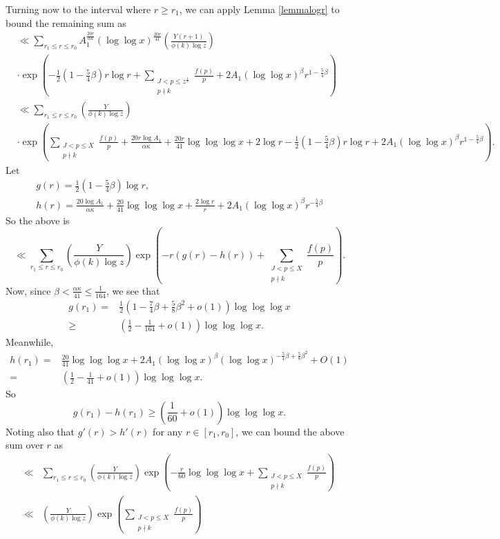 \documentclass{amsart}
\begin{document}
Turning now to the interval where $r\geq r_1$, we can apply Lemma \ref{lemmalogr} to bound the remaining sum as
\begin{align*}
&\ll \sum_{r_1\leq r\leq r_0}A_1^{\frac{20r}{\alpha\kappa}}\left(\log\log x\right)^{\frac{20r}{41}}\left(\frac{Y(r+1)}{\phi(k)\log z}\right)\\
&\cdot \exp\left(-\frac 12\left(1-\frac 54\beta\right)r\log r+\sum_{\substack{J<p\leq z^\frac 1r \\ p\nmid k}}\frac{f(p)}{p}+2A_1 (\log\log x)^{\beta}r^{1-\frac 54\beta}\right)\\
&\ll  \sum_{r_1\leq r\leq r_0}\left(\frac{Y}{\phi(k)\log z}\right)\\
&\cdot \exp\left(\sum_{\substack{J<p\leq X \\ p\nmid k}}\frac{f(p)}{p}+\frac{20r\log A_1}{\alpha\kappa}+\frac{20r}{41}\log\log\log x+2\log r-\frac 12\left(1-\frac 54\beta \right)r\log r+2A_1 (\log\log x)^{\beta}r^{1-\frac 54\beta }\right).
\end{align*}
Let
\begin{gather*}g(r)=\frac 12\left(1-\frac 54\beta \right)\log r,\\
h(r)=\frac{20\log A_1}{\alpha\kappa}+\frac{20}{41}\log\log\log x+\frac{2\log r}{r}+2A_1 (\log\log x)^{\beta}r^{-\frac 54\beta }
\end{gather*}
So the above is
$$\ll \sum_{r_1\leq r\leq r_0}\left(\frac{Y}{\phi(k)\log z}\right)\exp\left(-r(g(r)-h(r))+\sum_{\substack{J<p\leq X \\ p\nmid k}}\frac{f(p)}{p}\right).$$
Now, since $\beta<\frac{\alpha\kappa}{41}\leq \frac{1}{164}$,
we see that
\begin{align*}g(r_1)=&\frac 12\left(1-\frac 74\beta+\frac 58\beta^2+o(1)\right)\log\log\log x\\
\geq &\left(\frac 12-\frac{1}{164}+o(1)\right)\log\log\log x.
\end{align*}
Meanwhile,
\begin{align*}h(r_1)=&\frac{20}{41}\log\log\log x+2A_1 (\log\log x)^{\beta}(\log \log x)^{-\frac 54\beta+\frac 58\beta^2}+O(1)\\
=&\left(\frac 12-\frac{1}{41}+o(1)\right)\log\log\log x.
\end{align*}
So 
$$g(r_1)-h(r_1)\geq \left(\frac{1}{60}+o(1)\right)\log\log\log x.$$
Noting also that $g'(r)>h'(r)$ for any $r\in [r_1,r_0]$, we can bound the above sum over $r$ as
\begin{align*}\ll &\sum_{r_1\leq r\leq r_0}\left(\frac{Y}{\phi(k)\log z}\right)\exp\left(-\frac{r}{60}\log\log\log x+\sum_{\substack{J<p\leq X \\ p\nmid k}}\frac{f(p)}{p}\right)\\
\ll &\left(\frac{Y}{\phi(k)\log z}\right)\exp\left(\sum_{\substack{J<p\leq X \\ p\nmid k}}\frac{f(p)}{p}\right)
\end{align*}
\end{document}
